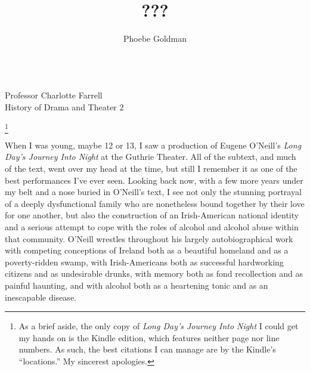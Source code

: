 \documentclass[letterpaper, 12pt]{article}
\title{???}
\author{Phoebe Goldman}
\date{\DTMDate{2020-05-13}}
\newcommand{\ldjin}{\textit{Long Day's Journey Into Night}}
\newcommand{\oneill}{O'Neill}
\newcommand{\theprof}{Professor Charlotte Farrell}
\newcommand{\theclass}{History of Drama and Theater 2}
\newcommand{\mlatitle}{\noindent\theauthor{}\hspace*{2cm}
\\\noindent\theprof{}\hspace*{2cm}
\\\noindent\theclass{}\hspace*{2cm}
\\\noindent\thedate{}\hspace*{2cm}
\begin{center}
  \thetitle{}
\end{center}}
\begin{document}
\RaggedRight
\thispagestyle{plain}

\mlatitle{}

\footnote{As a brief aside, the only copy of \ldjin{} I could get my hands on
  is the Kindle edition, which features neither page nor line numbers. As such,
the best citations I can manage are by the Kindle's \enquote{locations.} My
sincerest apologies.}

When I was young, maybe 12 or 13, I saw a production of Eugene \oneill{}'s
\ldjin{} at the Guthrie Theater. All of the subtext, and much of the text, went
over my head at the time, but still I remember it as one of the best
performances I've ever seen. Looking back now, with a few more years under my
belt and a nose buried in \oneill{}'s text, I see not only the stunning
portrayal of a deeply dysfunctional family who are nonetheless bound together
by their love for one another, but also the construction of an Irish-American
national identity and a serious attempt to cope with the roles of alcohol and
alcohol abuse within that community. \oneill{} wrestles throughout his largely
autobiographical work with competing conceptions of Ireland both as a beautiful
homeland and as a poverty-ridden swamp, with Irish-Americans both as successful
hardworking citizens and as undesirable drunks, with memory both as fond
recollection and as painful haunting, and with alcohol both as a heartening
tonic and as an inescapable disease.
\end{document}

